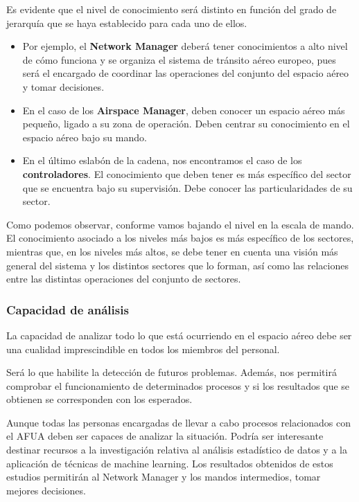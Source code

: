 Es evidente que el nivel de conocimiento será distinto en función del grado de jerarquía que se haya establecido para cada uno de ellos. 

\begin{itemize}
    \item Por ejemplo, el \textbf{Network Manager} deberá tener conocimientos a alto nivel de cómo funciona y se organiza el sistema de tránsito aéreo europeo, pues será el encargado de coordinar las operaciones del conjunto del espacio aéreo y tomar decisiones.
    
    \item En el caso de los \textbf{Airspace Manager}, deben conocer un espacio aéreo más pequeño, ligado a su zona de operación. Deben centrar su conocimiento en el espacio aéreo bajo su mando.
    
    \item En el último eslabón de la cadena, nos encontramos el caso de los \textbf{controladores}. El conocimiento que deben tener es más específico del sector que se encuentra bajo su supervisión. Debe conocer las particularidades de su sector.
\end{itemize}

Como podemos observar, conforme vamos bajando el nivel en la escala de mando. El conocimiento asociado a los niveles más bajos es más específico de los sectores, mientras que, en los niveles más altos, se debe tener en cuenta una visión más general del sistema y los distintos sectores que lo forman, así como las relaciones entre las distintas operaciones del conjunto de sectores.

\subsubsection{Capacidad de análisis}

La capacidad de analizar todo lo que está ocurriendo en el espacio aéreo debe ser una cualidad imprescindible en todos los miembros del personal.

Será lo que habilite la detección de futuros problemas. Además, nos permitirá comprobar el funcionamiento de determinados procesos y si los resultados que se obtienen se corresponden con los esperados. 

Aunque todas las personas encargadas de llevar a cabo procesos relacionados con el AFUA deben ser capaces de analizar la situación. Podría ser interesante destinar recursos a la investigación relativa al análisis estadístico de datos y a la aplicación de técnicas de machine learning. Los resultados obtenidos de estos estudios permitirán al Network Manager y los mandos intermedios, tomar mejores decisiones.

